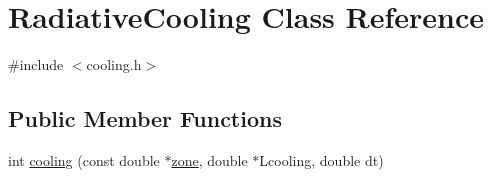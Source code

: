 \hypertarget{classRadiativeCooling}{}\section{Radiative\+Cooling Class Reference}
\label{classRadiativeCooling}


{\ttfamily \#include $<$cooling.\+h$>$}

\subsection*{Public Member Functions}
\begin{DoxyCompactItemize}
\item 
int \hyperlink{classRadiativeCooling_a5e4dbd5522e49baa82898ef742543e6d}{cooling} (const double $\ast$\hyperlink{structzone}{zone}, double $\ast$Lcooling, double dt)
\end{DoxyCompactItemize}
